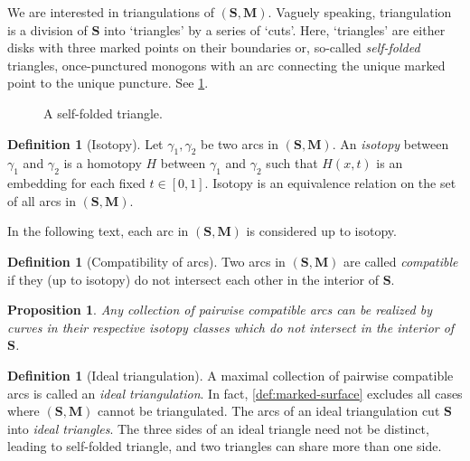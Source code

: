 \documentclass[a4paper,oneside,svgnames,draft]{amsart}
\theoremstyle{plain}
\newtheorem{proposition}[theorem]{Proposition}
\theoremstyle{definition}
\newtheorem{definition}[theorem]{Definition}
\begin{document}
 We are interested in triangulations of $(\mathbf{S},\mathbf{M})$. Vaguely
 speaking, triangulation is a division of $\mathbf{S}$ into `triangles' by a
 series of `cuts'. Here, `triangles' are either disks with three marked points
 on their boundaries or, so-called \emph{self-folded} triangles, once-punctured
 monogons with an arc connecting the unique marked point to the unique puncture.
 See \cref{fig:self-folded-triangle}.
 \begin{figure}[ht]
  \centering

  \caption{A self-folded triangle.}
  \label{fig:self-folded-triangle}
 \end{figure}

 \begin{definition}[Isotopy]
  \label{def:isotopy}
  Let $\gamma_1,\gamma_2$ be two arcs in $(\mathbf{S},\mathbf{M})$. An
  \emph{isotopy} between $\gamma_1$ and $\gamma_2$ is a homotopy $H$ between
  $\gamma_1$ and $\gamma_2$ such that $H(x,t)$ is an embedding for each fixed
  $t \in [0,1]$. Isotopy is an equivalence relation on the set of all arcs in
  $(\mathbf{S},\mathbf{M})$.
 \end{definition}
 In the following text, each arc in $(\mathbf{S},\mathbf{M})$ is considered up
 to isotopy.

 \begin{definition}[Compatibility of arcs]
  \label{def:compatibility-of-arcs}
  Two arcs in $(\mathbf{S},\mathbf{M})$ are called \emph{compatible} if they (up
  to isotopy) do not intersect each other in the interior of $\mathbf{S}$.
 \end{definition}

 \begin{proposition}
  \label{prop:triangulation-up-to-isotopy}
  Any collection of pairwise compatible arcs can be realized by curves in their
  respective isotopy classes which do not intersect in the interior of
  $\mathbf{S}$.
 \end{proposition}

 \begin{definition}[Ideal triangulation]
  \label{def:ideal-triangulation}
  A maximal collection of pairwise compatible arcs is called an \emph{ideal
  triangulation}. In fact, \cref{def:marked-surface} excludes all cases where
  $(\mathbf{S},\mathbf{M})$ cannot be triangulated. The arcs of an ideal
  triangulation cut $\mathbf{S}$ into \emph{ideal triangles}. The three sides of
  an ideal triangle need not be distinct, leading to self-folded triangle, and
  two triangles can share more than one side.
 \end{definition}

 
\end{document}

